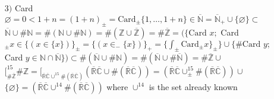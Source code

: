 \documentclass{article}
\begin{document}
\begin{Large}
{\begin{itemize}
    $\{(x_\pm)_+,\{\{x_\pm\}_\mp\}_{\pm_1}\} \subset \left( \{ \int (x_2)_{\mp} ; \int \equiv \int_{\pm_1}\} \cup \{ x_\mp\}_{\pm_1} \cup \{\{x_\pm\}_{\mp_1}\}_{\pm} \right) \cap x_- S_- \}\}_+ $\newline
    $=\bigl[_S S_- = \bigl[_{\#\varnothing} S_- = \bigl[_{\# \varnothing}  \biggl( \{\rceil_- \rceil_\pm\}+ , \{ \dot{\rceil}_- \rceil_\pm\}_+,  \{ \dot{\rceil}_- \dot{\rceil}_\pm\}_+,\dots,\varnothing \in \{\varnothing\}\}\cup$\newline
    $\{\rceil \{\rceil_\pm \rceil_\pm\}_+ , \dot{\rceil}\{\rceil_\pm\rceil_\pm\}_+ , \dot{\rceil}\{\dot\rceil_\pm\rceil_\pm\}_+ , \dot{\rceil}\{\dot\rceil_\pm \dot\rceil_\pm\},\dots,\varnothing \in \{\varnothing\}\}  \biggl) = $\newline
    $\bigl[_{\#\varnothing} \{\{x_\pm\}_+;\{y_\pm\}_+ \in \{ (y_\mp\dot\in\#\varnothing), (y_\mp\dot\in\#\varnothing)\}\} = \bigl[_{S_+\cup S_- \cup \{\varnothing\} } S_- = $\newline
    the general Euclydian space $S_+;$
    \item[$3)$] Card $\varnothing =0 < 1+n = (1+n)_\pm = \text{Card}_\pm \{1,\dots,1+n\} \in \overline{\mathbb{N}} = \overline{\mathbb{N}}_+ \cup \{\varnothing\} \subset $ \newline 
    $\overline{\mathbb{N}}\cup \#\mathbb{N} = \#(\mathbb{N} \cup \#\mathbb{N}) = \# (\mathbb{Z}\cup\overline{\mathbb{Z}}) = \# \overline{\mathbb{Z}} = \bigl(\{\text{Card } x; $\newline
    Card$_\pm x \in \{(x\in \{x\})\}_\pm = \{(x\in_- \{x\})\}_+ = \{ \int_\pm \text{Card}_\pm x\}_\pm \} \cup \{\# \text{Card }y;$\newline            
    Card $y\in \mathbb{N}\cap \overline{\mathbb{N}}\} \bigl) \subset \# (\overline{\mathbb{N}}\cup \# \mathbb{N}) = \# (\overline{\mathbb{N}}\cup \# \overline{\mathbb{N}}) = \#\overline{\mathbb{Z}} \cup $\newline
    $\bigl[^{15}_{\#\overline{\mathbb{Z}}} \#\mathbb{Z} = \bigl[_{\overline{\mathbb{R}}\overline{\mathbb{C}}\cup^{15}\#(\overline{\mathbb{R}}\overline{\mathbb{C}})} (\overline{\mathbb{R}}\overline{\mathbb{C}}\cup\#(\overline{\mathbb{R}}\overline{\mathbb{C}})) = (\overline{\mathbb{R}}\overline{\mathbb{C}}\cup_\pm^{15}\#(\overline{\mathbb{R}}\overline{\mathbb{C}})) \cup$\newline
    $\{\varnothing\} = (\overline{\mathbb{R}}\overline{\mathbb{C}}\cup^{14}\#(\overline{\mathbb{R}}\overline{\mathbb{C}}))$ where $\cup^{14}$ is the set already known\newline

\end{itemize}}
\end{Large}
\end{document}
